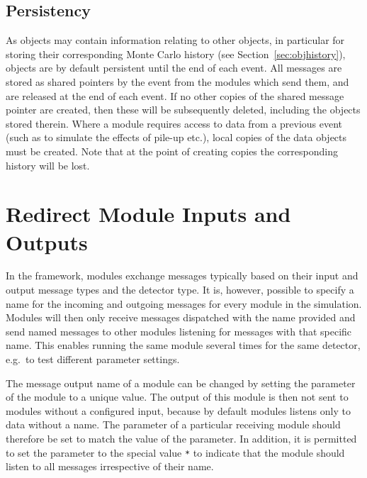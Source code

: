 \subsection{Persistency}
\label{ch:objects_persistency}
As objects may contain information relating to other objects, in particular for storing their corresponding Monte Carlo history (see Section~\ref{sec:objhistory}), objects are by default persistent until the end of each event. All messages are stored as shared pointers by the event from the modules which send them, and are released at the end of each event. If no other copies of the shared message pointer are created, then these will be subsequently deleted, including the objects stored therein. Where a module requires access to data from a previous event (such as to simulate the effects of pile-up etc.), local copies of the data objects must be created. Note that at the point of creating copies the corresponding history will be lost.


\section{Redirect Module Inputs and Outputs}
\label{sec:redirect_module_input_outputs}
In the \apsq framework, modules exchange messages typically based on their input and output message types and the detector type.
It is, however, possible to specify a name for the incoming and outgoing messages for every module in the simulation.
Modules will then only receive messages dispatched with the name provided and send named messages to other modules listening for messages with that specific name.
This enables running the same module several times for the same detector, e.g.\ to test different parameter settings.

The message output name of a module can be changed by setting the  parameter of the module to a unique value.
The output of this module is then not sent to modules without a configured input, because by default modules listens only to data without a name.
The  parameter of a particular receiving module should therefore be set to match the value of the  parameter.
In addition, it is permitted to set the  parameter to the special value \texttt{*} to indicate that the module should listen to all messages irrespective of their name.

